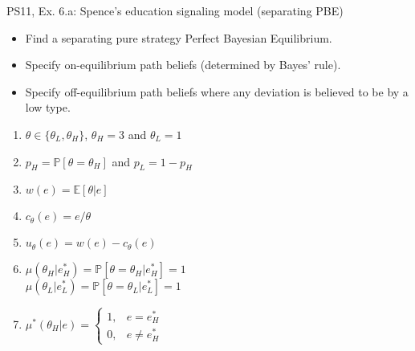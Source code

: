 \begin{frame}{PS11, Ex. 6.a: Spence’s education signaling model (separating PBE)}
    \begin{itemize}
      \item[(a)] Find a separating pure strategy Perfect Bayesian Equilibrium.
    \end{itemize}\vspace{-8pt}
    \begin{multicols}{2}
      \begin{itemize}
        \item[Step 1:] Specify on-equilibrium path beliefs (determined by Bayes' rule).
        \item[Step 2:] Specify off-equilibrium path beliefs where any deviation is believed to be by a low type.
      \end{itemize}
      \vfill\null\columnbreak
      \begin{enumerate}
        \item[Types:] $\theta\in\{\theta_L,\theta_H\}$, $\theta_H=3$ and $\theta_L=1$
        \item[Prob.:] $p_H=\mathbb{P}[\theta=\theta_H]$ and $p_L=1-p_H$
        \item[Wage:] $w(e)=\mathbb{E}[\theta|e]$
        \item[Cost:] $c_\theta(e)=e/\theta$
        \item[Utility:] $u_\theta(e)=w(e)-c_\theta(e)$
        \item $\mu\left(\theta_H|e_H^*\right)=
               \mathbb{P}\left[\theta=\theta_H|e_H^*\right]=1$\\
              $\mu\left(\theta_L|e_L^*\right)=
               \mathbb{P}\left[\theta=\theta_L|e_L^*\right]=1$
        \item $\mu^*(\theta_H|e)=\left\{\begin{array}{ll}
                  1, & e = e_H^* \\
                  0, & e \neq e_H^*
               \end{array}\right.$
      \end{enumerate}
    \end{multicols}
    \vfill\null
\end{frame}
